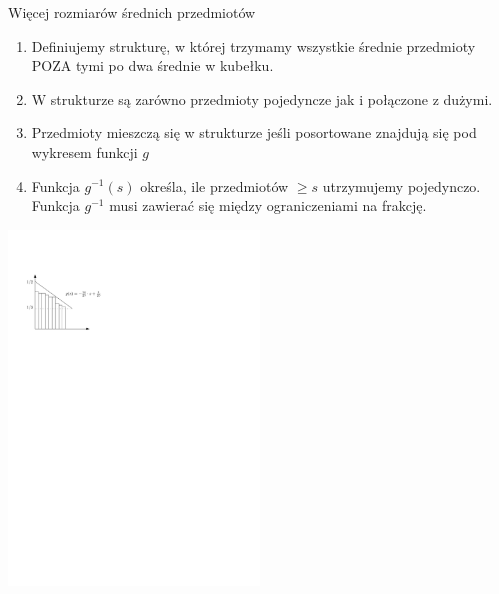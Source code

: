 \documentclass{beamer}
\begin{document}
\begin{frame}{Więcej rozmiarów średnich przedmiotów}
  \footnotesize
  \begin{enumerate}
    \item  Definiujemy strukturę, w której trzymamy wszystkie średnie przedmioty POZA tymi po dwa średnie w kubełku.
    \item W strukturze są zarówno przedmioty pojedyncze jak i połączone z dużymi.
    \item Przedmioty mieszczą się w strukturze jeśli posortowane znajdują się pod wykresem funkcji $g$
    \item Funkcja $g^{-1}(s)$ określa, ile przedmiotów $\geq s$ utrzymujemy pojedynczo.
  Funkcja $g^{-1}$ musi zawierać się między ograniczeniami na frakcję.
  \end{enumerate}
  
  \begin{center}
    \includegraphics[width=0.5\textwidth]{figs/D.pdf}
  \end{center}


\end{frame}
\end{document}
